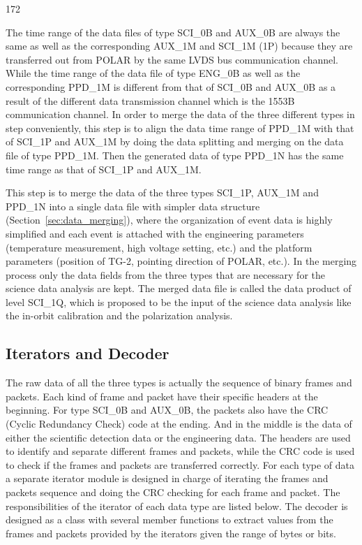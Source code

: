 \documentclass{raa}
\begin{document}
\begin{dingautolist}{172}
\item The time range of the data files of type SCI\_0B and AUX\_0B are always the same as well as the corresponding AUX\_1M and SCI\_1M (1P) because they are transferred out from POLAR by the same LVDS bus communication channel. While the time range of the data file of type ENG\_0B as well as the corresponding PPD\_1M is different from that of SCI\_0B and AUX\_0B as a result of the different data transmission channel which is the 1553B communication channel. In order to merge the data of the three different types in step  conveniently, this step is to align the data time range of PPD\_1M with that of SCI\_1P and AUX\_1M by doing the data splitting and merging on the data file of type PPD\_1M. Then the generated data of type PPD\_1N has the same time range as that of SCI\_1P and AUX\_1M.
\item This step is to merge the data of the three types SCI\_1P, AUX\_1M and PPD\_1N into a single data file with simpler data structure (Section~\ref{sec:data_merging}), where the organization of event data is highly simplified and each event is attached with the engineering parameters (temperature measurement, high voltage setting, etc.) and the platform parameters (position of TG-2, pointing direction of POLAR, etc.). In the merging process only the data fields from the three types that are necessary for the science data analysis are kept. The merged data file is called the data product of level SCI\_1Q, which is proposed to be the input of the science data analysis like the in-orbit calibration and the polarization analysis.
\end{dingautolist}

\subsection{Iterators and Decoder}\label{sec:iterator_decoder}
The raw data of all the three types is actually the sequence of binary frames and packets. Each kind of frame and packet have their specific headers at the beginning. For type SCI\_0B and AUX\_0B, the packets also have the CRC (Cyclic Redundancy Check) code at the ending. And in the middle is the data of either the scientific detection data or the engineering data. The headers are used to identify and separate different frames and packets, while the CRC code is used to check if the frames and packets are transferred correctly. For each type of data a separate iterator module is designed in charge of iterating the frames and packets sequence and doing the CRC checking for each frame and packet. The responsibilities of the iterator of each data type are listed below. The decoder is designed as a class with several member functions to extract values from the frames and packets provided by the iterators given the range of bytes or bits.
\end{document}
